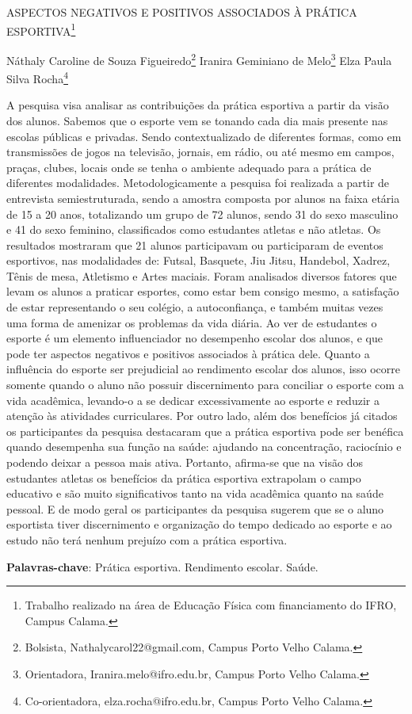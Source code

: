 \documentclass[article,12pt,onesidea,4paper,english,brazil]{abntex2}
\begin{document}
	
	
	\frenchspacing 
	
	\begin{center}
		\LARGE ASPECTOS NEGATIVOS E POSITIVOS ASSOCIADOS À PRÁTICA ESPORTIVA\footnote{Trabalho realizado na área de Educação Física com financiamento do IFRO, Campus Calama.}
		
		\normalsize
		Náthaly Caroline de Souza Figueiredo\footnote{Bolsista, Nathalycarol22@gmail.com, Campus Porto Velho Calama.} 
		Iranira Geminiano de Melo\footnote{Orientadora, Iranira.melo@ifro.edu.br, Campus Porto Velho Calama.} 
		Elza Paula Silva Rocha\footnote{Co-orientadora, elza.rocha@ifro.edu.br, Campus Porto Velho Calama.} 
	\end{center}
	
	\noindent A pesquisa visa analisar as contribuições da prática esportiva a partir da visão
	dos alunos. Sabemos que o esporte vem se tonando cada dia mais presente nas
	escolas públicas e privadas. Sendo contextualizado de diferentes formas, como em
	transmissões de jogos na televisão, jornais, em rádio, ou até mesmo em campos,
	praças, clubes, locais onde se tenha o ambiente adequado para a prática de
	diferentes modalidades. Metodologicamente a pesquisa foi realizada a partir de
	entrevista semiestruturada, sendo a amostra composta por alunos na faixa etária de
	15 a 20 anos, totalizando um grupo de 72 alunos, sendo 31 do sexo masculino e 41
	do sexo feminino, classificados como estudantes atletas e não atletas. Os resultados
	mostraram que 21 alunos participavam ou participaram de eventos esportivos, nas
	modalidades de: Futsal, Basquete, Jiu Jitsu, Handebol, Xadrez, Tênis de mesa,
	Atletismo e Artes maciais. Foram analisados diversos fatores que levam os alunos a
	praticar esportes, como estar bem consigo mesmo, a satisfação de estar
	representando o seu colégio, a autoconfiança, e também muitas vezes uma forma
	de amenizar os problemas da vida diária. Ao ver de estudantes o esporte é um
	elemento influenciador no desempenho escolar dos alunos, e que pode ter aspectos
	negativos e positivos associados à prática dele. Quanto a influência do esporte ser
	prejudicial ao rendimento escolar dos alunos, isso ocorre somente quando o aluno
	não possuir discernimento para conciliar o esporte com a vida acadêmica, levando-o
	a se dedicar excessivamente ao esporte e reduzir a atenção às atividades
	curriculares. Por outro lado, além dos benefícios já citados os participantes da
	pesquisa destacaram que a prática esportiva pode ser benéfica quando
	desempenha sua função na saúde: ajudando na concentração, raciocínio e podendo
	deixar a pessoa mais ativa. Portanto, afirma-se que na visão dos estudantes atletas
	os benefícios da prática esportiva extrapolam o campo educativo e são muito
	significativos tanto na vida acadêmica quanto na saúde pessoal. E de modo geral os
	participantes da pesquisa sugerem que se o aluno esportista tiver discernimento e
	organização do tempo dedicado ao esporte e ao estudo não terá nenhum prejuízo
	com a prática esportiva.
	
	\vspace{\onelineskip}
	
	\noindent
	\textbf{Palavras-chave}: Prática esportiva. Rendimento escolar. Saúde.
	
\end{document}
